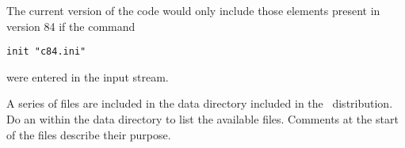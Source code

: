 The current version of the code would only include those elements present
in version 84 if the command
\begin{verbatim}
init "c84.ini"
\end{verbatim}
were entered in the input stream.

A series of  files are included in the
data directory included in the \Cloudy\ distribution.
Do an  within the data directory
to list the available files.
Comments at the start of the files describe
their purpose.



